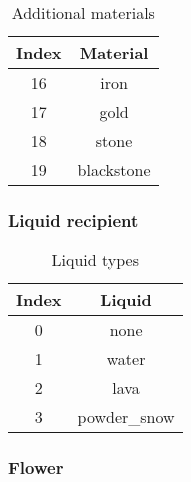\begin{table}[H]
	\centering
	\begin{tabular}{ |c|c| }
		\hline
		Index & Material \\
		\hline
		16 & iron \\
		17 & gold \\
		18 & stone \\
		19 & blackstone \\
		\hline
	\end{tabular}
	\caption{Additional materials}
\end{table}


\subsubsection{Liquid recipient}

\begin{table}[H]
	\centering
	\begin{tabular}{ |c|c| }
		\hline
		Index & Liquid \\
		\hline
		0 & none \\
		1 & water \\
		2 & lava \\
		3 & powder\_snow \\
		\hline
	\end{tabular}
	\caption{Liquid types}
\end{table}

\subsubsection{Flower}\label{spigot-types:flower}

